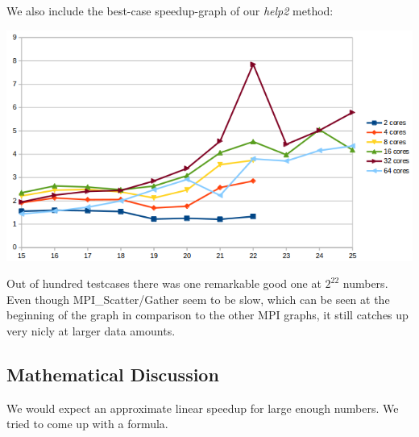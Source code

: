 We also include the best-case speedup-graph of our \textit{help2} method:
\begin{center}
\includegraphics[width=\textwidth]{MPI_help2}
\end{center}

Out of hundred testcases there was one remarkable good one at \(2^{22}\) numbers. Even though MPI\_Scatter/Gather seem to be slow, which can be seen at the beginning of the graph in comparison to the other MPI graphs, it still catches up very nicly at larger data amounts.
   
\subsection{Mathematical Discussion}
We would expect an approximate linear speedup for large enough numbers. We tried to come up with a formula.

